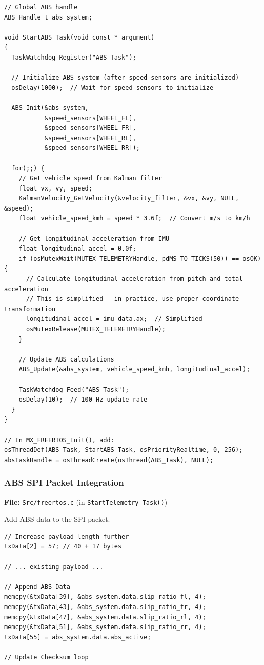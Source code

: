\documentclass[11pt,a4paper]{article}
\begin{document}
\begin{lstlisting}[caption=ABS Task Implementation, label=lst:abstask]
// Global ABS handle
ABS_Handle_t abs_system;

void StartABS_Task(void const * argument)
{
  TaskWatchdog_Register("ABS_Task");
  
  // Initialize ABS system (after speed sensors are initialized)
  osDelay(1000);  // Wait for speed sensors to initialize
  
  ABS_Init(&abs_system,
           &speed_sensors[WHEEL_FL],
           &speed_sensors[WHEEL_FR],
           &speed_sensors[WHEEL_RL],
           &speed_sensors[WHEEL_RR]);
  
  for(;;) {
    // Get vehicle speed from Kalman filter
    float vx, vy, speed;
    KalmanVelocity_GetVelocity(&velocity_filter, &vx, &vy, NULL, &speed);
    float vehicle_speed_kmh = speed * 3.6f;  // Convert m/s to km/h
    
    // Get longitudinal acceleration from IMU
    float longitudinal_accel = 0.0f;
    if (osMutexWait(MUTEX_TELEMETRYHandle, pdMS_TO_TICKS(50)) == osOK) {
      // Calculate longitudinal acceleration from pitch and total acceleration
      // This is simplified - in practice, use proper coordinate transformation
      longitudinal_accel = imu_data.ax;  // Simplified
      osMutexRelease(MUTEX_TELEMETRYHandle);
    }
    
    // Update ABS calculations
    ABS_Update(&abs_system, vehicle_speed_kmh, longitudinal_accel);
    
    TaskWatchdog_Feed("ABS_Task");
    osDelay(10);  // 100 Hz update rate
  }
}

// In MX_FREERTOS_Init(), add:
osThreadDef(ABS_Task, StartABS_Task, osPriorityRealtime, 0, 256);
absTaskHandle = osThreadCreate(osThread(ABS_Task), NULL);
\end{lstlisting}

\subsubsection{ABS SPI Packet Integration}

\textbf{File:} \texttt{Src/freertos.c} (in \texttt{StartTelemetry\_Task()})

Add ABS data to the SPI packet.

\begin{lstlisting}[caption=ABS SPI Data, label=lst:absspi]
// Increase payload length further
txData[2] = 57; // 40 + 17 bytes

// ... existing payload ...

// Append ABS Data
memcpy(&txData[39], &abs_system.data.slip_ratio_fl, 4);
memcpy(&txData[43], &abs_system.data.slip_ratio_fr, 4);
memcpy(&txData[47], &abs_system.data.slip_ratio_rl, 4);
memcpy(&txData[51], &abs_system.data.slip_ratio_rr, 4);
txData[55] = abs_system.data.abs_active;

// Update Checksum loop
\end{lstlisting}
\end{document}
